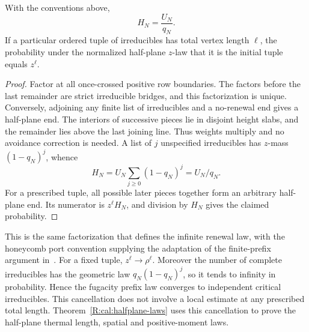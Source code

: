 \begin{lemma}\label{lem:halfplane}\label{R:renew:halfplane}\label{R:thermal:remainder}
With the conventions above,
\[
 H_N=\frac{U_N}{q_N}.
\]
If a particular ordered tuple of irreducibles has total vertex length $\ell$, the probability under the normalized half-plane $z$-law that it is the initial tuple equals $z^\ell$.
\end{lemma}
\begin{proof}
Factor at all once-crossed positive row boundaries. The factors before the last remainder are strict irreducible bridges, and this factorization is unique. Conversely, adjoining any finite list of irreducibles and a no-renewal end gives a half-plane end. The interiors of successive pieces lie in disjoint height slabs, and the remainder lies above the last joining line. Thus weights multiply and no avoidance correction is needed. A list of $j$ unspecified irreducibles has $z$-mass $(1-q_N)^j$, whence
\[
 H_N=U_N\sum_{j\ge0}(1-q_N)^j=U_N/q_N.
\]
For a prescribed tuple, all possible later pieces together form an arbitrary half-plane end. Its numerator is $z^\ell H_N$, and division by $H_N$ gives the claimed probability.
\end{proof}
This is the same factorization that defines the infinite renewal law, with the honeycomb port convention supplying the adaptation of the finite-prefix argument in~\cite[Propositions~2.2--2.3]{Dyhr2011}. For a fixed tuple, $z^\ell\to\rho^\ell$. Moreover the number of complete irreducibles has the geometric law $q_N(1-q_N)^j$, so it tends to infinity in probability. Hence the fugacity prefix law converges to independent critical irreducibles. This cancellation does not involve a local estimate at any prescribed total length.
Theorem~\ref{R:cal:halfplane-laws} uses this cancellation to prove the half-plane thermal length, spatial and positive-moment laws.

